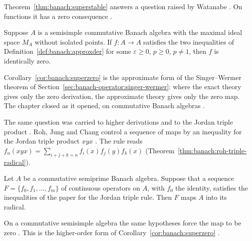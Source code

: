 Theorem~\ref{thm:banach:superstable} answers a question raised by
Watanabe \cite[p.~526]{MiuraHirasawaTakahasi2006}. On functions it has a zero
consequence \cite[Corollary~3, p.~526]{MiuraHirasawaTakahasi2006}.

\begin{corollary}\label{cor:banach:superzero}
Suppose $A$ is a semisimple commutative Banach algebra with the maximal
ideal space $M_A$ without isolated points. If $f:A\to A$ satisfies the two
inequalities of Definition~\ref{def:banach:approxder} for some
$\varepsilon\ge 0$, $p\ge 0$, $p\ne 1$, then $f$ is identically zero.
\end{corollary}

Corollary~\ref{cor:banach:superzero} is the approximate form of the
Singer--Wermer theorem of
Section~\ref{sec:banach-operator:singer-wermer}: where the exact theory
gives only the zero derivation, the approximate theory gives only the zero
map. The chapter closed as it opened, on commutative Banach algebras
\cite[Corollary~3, p.~526]{MiuraHirasawaTakahasi2006}.

The same question was carried to higher derivations and to the Jordan triple
product \cite[p.~1975]{RohJungChang2009Triple}.
Roh, Jung and Chang control a sequence of maps by an inequality for the
Jordan triple product $xyx$
\cite[p.~1976]{RohJungChang2009Triple}. The rule reads
$f_n(xyx)=\sum_{i+j+k=n}f_i(x)f_j(y)f_k(x)$ (Theorem~\ref{thm:banach:roh-triple-radical}).

\begin{theorem}\label{thm:banach:roh-triple-radical}
Let $A$ be a commutative semiprime Banach algebra. Suppose that a sequence
$F=\{f_0,f_1,\dots,f_m\}$ of continuous operators on $A$, with $f_0$ the
identity, satisfies the inequalities of the paper for the Jordan triple rule.
Then $F$ maps $A$ into its radical.
\end{theorem}

On a commutative semisimple algebra the same hypotheses force the map to be
zero \cite[Corollary~2.8, p.~1986]{RohJungChang2009Triple}. This is the
higher-order form of Corollary~\ref{cor:banach:superzero}
\cite[p.~1986]{RohJungChang2009Triple}.

